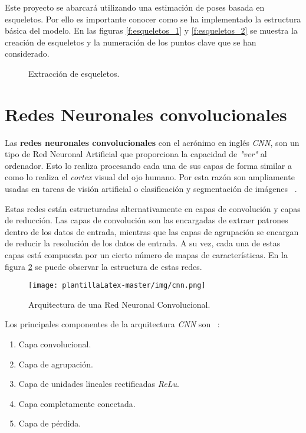 Este proyecto se abarcará utilizando una estimación de poses basada en esqueletos. Por ello es importante conocer como se ha implementado la estructura básica del modelo. En las figuras \ref{f:esqueletos_1} y \ref{f:esqueletos_2} se muestra la creación de esqueletos y la numeración de los puntos clave que se han considerado. 


\begin{figure}
 \centering
 \caption{Extracción de esqueletos.}
 \label{f:esqueletos}
\end{figure}


\section{Redes Neuronales convolucionales} \label{cap:convolucional}

Las \textbf{redes neuronales convolucionales} con el acrónimo en inglés \textit{CNN}, son un tipo de Red Neuronal Artificial que proporciona la capacidad de \textit{"ver"} al ordenador. Esto lo realiza procesando cada una de sus capas de forma similar a como lo realiza el \textit{cortex} visual del ojo humano. Por esta razón son ampliamente usadas en tareas de visión artificial o clasificación y segmentación de imágenes ~\cite{CRUZ2021103530}.

Estas redes están estructuradas alternativamente en capas de convolución y capas de reducción. Las capas de convolución son las encargadas de extraer patrones dentro de los datos de entrada, mientras que las capas de agrupación se encargan de reducir la resolución de los datos de entrada. A su vez, cada una de estas capas está compuesta por un cierto número de mapas de características. En la figura \ref{f:cnn} se puede observar la estructura de estas redes.

\begin{figure}[H]
 \centering
    \texttt{[image: plantillaLatex-master/img/cnn.png]}
    \caption{Arquitectura de una Red Neuronal Convolucional.}
    \label{f:cnn}
\end{figure}

Los principales componentes de la arquitectura \textit{CNN} son ~\cite{bonilla2020redes}:
\begin{enumerate}
    \item Capa convolucional.
    \item Capa de agrupación.
    \item Capa de unidades lineales rectificadas \textit{ReLu}.
    \item Capa completamente conectada.
    \item Capa de pérdida.
\end{enumerate}


